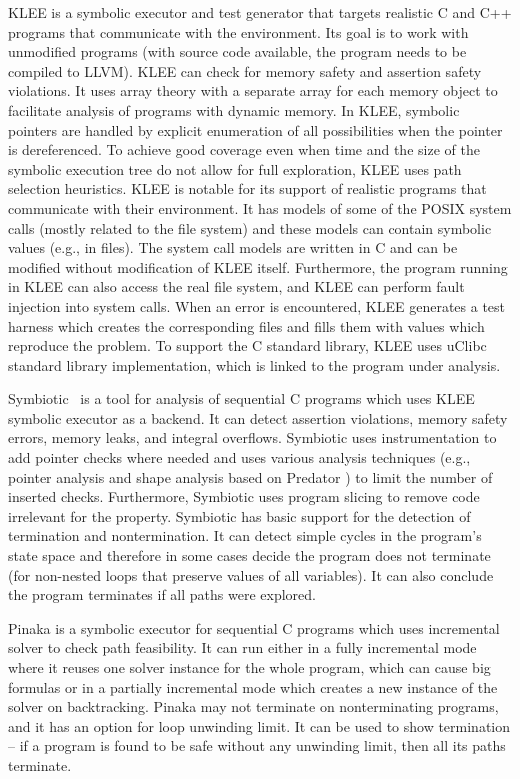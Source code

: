 KLEE  is a symbolic executor and test generator that targets realistic C and C++ programs that communicate with the environment.
Its goal is to work with unmodified programs (with source code available, the program needs to be compiled to LLVM).
KLEE can check for memory safety and assertion safety violations.
It uses array theory with a separate array for each memory object to facilitate analysis of programs with dynamic memory.
In KLEE, symbolic pointers are handled by explicit enumeration of all possibilities when the pointer is dereferenced.
To achieve good coverage even when time and the size of the symbolic execution tree do not allow for full exploration, KLEE uses path selection heuristics.
KLEE is notable for its support of realistic programs that communicate with their environment.
It has models of some of the POSIX system calls (mostly related to the file system) and these models can contain symbolic values (e.g., in files).
The system call models are written in C and can be modified without modification of KLEE itself.
Furthermore, the program running in KLEE can also access the real file system, and KLEE can perform fault injection into system calls.
When an error is encountered, KLEE generates a test harness which creates the corresponding files and fills them with values which reproduce the problem.
To support the C standard library, KLEE uses uClibc standard library implementation, which is linked to the program under analysis.

Symbiotic~ is a tool for analysis of sequential C programs which uses KLEE symbolic executor as a backend.
It can detect assertion violations, memory safety errors, memory leaks, and integral overflows.
Symbiotic uses instrumentation to add pointer checks where needed and uses various analysis techniques (e.g., pointer analysis and shape analysis based on Predator ) to limit the number of inserted checks.
Furthermore, Symbiotic uses program slicing to remove code irrelevant for the property.
Symbiotic has basic support for the detection of termination and nontermination.
It can detect simple cycles in the program's state space and therefore in some cases decide the program does not terminate (for non-nested loops that preserve values of all variables).
It can also conclude the program terminates if all paths were explored.

Pinaka  is a symbolic executor for sequential C programs which uses incremental solver to check path feasibility.
It can run either in a fully incremental mode where it reuses one solver instance for the whole program, which can cause big formulas or in a partially incremental mode which creates a new instance of the solver on backtracking.
Pinaka may not terminate on nonterminating programs, and it has an option for loop unwinding limit.
It can be used to show termination -- if a program is found to be safe without any unwinding limit, then all its paths terminate.

